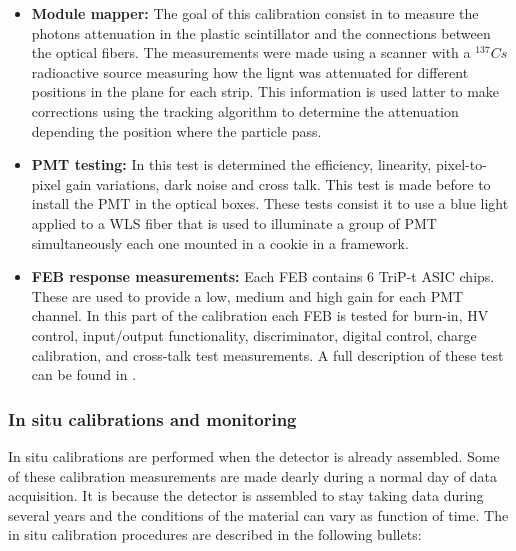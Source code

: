 \begin{itemize}
    \item \textbf{Module mapper:} The goal of this calibration consist in to measure the photons attenuation in the plastic scintillator and the connections between the optical fibers. The measurements were made using a scanner with a $^{137}Cs$ radioactive source measuring how the lignt was attenuated for different positions in the plane for each strip. This information is used latter to make corrections using the tracking algorithm to determine the attenuation depending the position where the particle pass.
    \item \textbf{PMT testing:} In this test is determined the efficiency, linearity, pixel-to-pixel gain variations, dark noise and cross talk. This test is made before to install the PMT in the optical boxes. These tests consist it to use a blue light applied to a WLS fiber that is used to illuminate a group of PMT simultaneously each one mounted in a cookie in a framework.
    \item \textbf{FEB response measurements:} Each FEB contains 6 TriP-t ASIC chips. These are used to provide a low, medium and high gain for each PMT channel. In this part of the calibration each FEB is tested for burn-in, HV control, input/output functionality, discriminator, digital control, charge calibration, and cross-talk test measurements. A full description of these test can be found in \cite{MINERvA}.    
\end{itemize}


\subsubsection{In situ calibrations and monitoring}
\label{Cap:MnvExp:MnvDetector:Calibration:InSitu}

In situ calibrations are performed when the detector is already assembled. Some of these calibration measurements are made dearly during a normal day of data acquisition. It is because the detector is assembled to stay taking data during several years and the conditions of the material can vary as function of time. The in situ calibration procedures are described in the following bullets:

